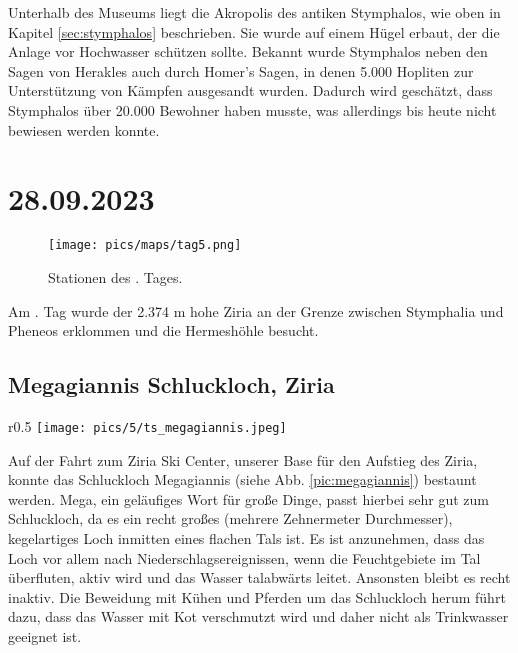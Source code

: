 \documentclass[preprint]{geomorphica} %
\begin{document}
Unterhalb des Museums liegt die Akropolis des antiken Stymphalos, wie oben in Kapitel \ref{sec:stymphalos} beschrieben. Sie wurde auf einem Hügel erbaut, der die Anlage vor Hochwasser schützen sollte. Bekannt wurde Stymphalos neben den Sagen von Herakles auch durch Homer's Sagen, in denen 5.000 Hopliten zur Unterstützung von Kämpfen ausgesandt wurden. Dadurch wird geschätzt, dass Stymphalos über 20.000 Bewohner haben musste, was allerdings bis heute nicht bewiesen werden konnte.


\newpage

\section{28.09.2023}

\begin{figure}[!h]
    \centering
    \texttt{[image: pics/maps/tag5.png]}
    \caption{Stationen des \theday. Tages.}
    \label{pic:tag5}
\end{figure}

Am \theday. Tag wurde der 2.374 m hohe Ziria an der Grenze zwischen Stymphalia und Pheneos erklommen und die Hermeshöhle besucht.

\subsection{Megagiannis Schluckloch, Ziria}

\begin{wrapfigure}{r}{0.5\textwidth}
    \centering
    \texttt{[image: pics/5/ts\_megagiannis.jpeg]}
    \caption{Das Schluckloch Megagiannis im Tal vor dem Ziria Ski Center [Foto: Tabea Storch].}
    \label{pic:megagiannis}
\end{wrapfigure}

Auf der Fahrt zum Ziria Ski Center, unserer Base für den Aufstieg des Ziria, konnte das Schluckloch Megagiannis (siehe Abb. \ref{pic:megagiannis}) bestaunt werden. Mega, ein geläufiges Wort für große Dinge, passt hierbei sehr gut zum Schluckloch, da es ein recht großes (mehrere Zehnermeter Durchmesser), kegelartiges Loch inmitten eines flachen Tals ist. Es ist anzunehmen, dass das Loch vor allem nach Niederschlagsereignissen, wenn die Feuchtgebiete im Tal überfluten, aktiv wird und das Wasser talabwärts leitet. Ansonsten bleibt es recht inaktiv. Die Beweidung mit Kühen und Pferden um das Schluckloch herum führt dazu, dass das Wasser mit Kot verschmutzt wird und daher nicht als Trinkwasser geeignet ist. 
\end{document}
